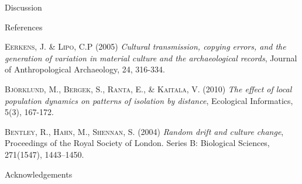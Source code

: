 \documentclass[final]{beamer}
\newlength{\onecolwid}
\begin{document}
\begin{frame}[t]
\begin{columns}[t]
\begin{column}{\onecolwid}
\begin{block}{Discussion}
\end{block}

\begin{block}{References}
\small

\begin{thebibliography}{50}


\textsc{Eerkens, J. \& Lipo, C.P (2005)}
\textit{Cultural transmission, copying errors, and the generation of variation in material culture and the archaeological records}, Journal of Anthropological Archaeology, 24, 316-334.

\textsc{Bj\"{o}rklund, M., Bergek, S., Ranta, E., \& Kaitala, V. (2010)}
\textit{The effect of local population dynamics on patterns of isolation by distance}, Ecological Informatics, 5(3), 167-172.

\textsc{Bentley, R., Hahn, M., Shennan, S. (2004)}
\textit{Random drift and culture change}, Proceedings of the Royal Society of London. Series B: Biological Sciences, 271(1547), 1443--1450.


\end{thebibliography}
%	

\end{block}



\begin{block}{Acknowledgements}

\small{}

\end{block}





\end{column}
\end{columns}
\end{frame}
\end{document}
